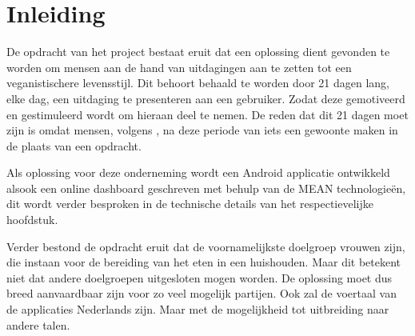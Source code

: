 
\chapter{Inleiding}
\label{ch:inleiding}

De opdracht van het project bestaat eruit dat een oplossing dient gevonden te worden om mensen aan de hand van uitdagingen aan te zetten tot een veganistischere levensstijl. Dit behoort behaald te worden door 21 dagen lang, elke dag, een uitdaging te presenteren aan een gebruiker. Zodat deze gemotiveerd en gestimuleerd wordt om hieraan deel te nemen. De reden dat dit 21 dagen moet zijn is omdat mensen, volgens \textcite{eva_video}, na deze periode van iets een gewoonte maken in de plaats van een opdracht.

Als oplossing voor deze onderneming wordt een Android applicatie ontwikkeld alsook een online dashboard geschreven met behulp van de MEAN technologieën, dit wordt verder besproken in de technische details van het respectievelijke hoofdstuk.

Verder bestond de opdracht eruit dat de voornamelijkste doelgroep vrouwen zijn, die instaan voor de bereiding van het eten in een huishouden. Maar dit betekent niet dat andere doelgroepen uitgesloten mogen worden. De oplossing moet dus breed aanvaardbaar zijn voor zo veel mogelijk partijen. Ook zal de voertaal van de applicaties Nederlands zijn. Maar met de mogelijkheid tot uitbreiding naar andere talen.